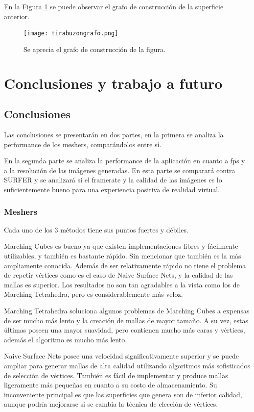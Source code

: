 \documentclass[12pt]{article}
\begin{document}
En la Figura \ref{grafobz} se puede observar el grafo de construcción de la superficie anterior. 
\begin{figure}[h!]
\texttt{[image: tirabuzongrafo.png]}
\caption{Se aprecia el grafo de construcción de la figura.}
\label{grafobz}
\end{figure}
\clearpage
\section{Conclusiones y trabajo a futuro}
\subsection{Conclusiones}
Las conclusiones se presentarán en dos partes, en la primera se analiza la performance de los meshers, comparándolos entre sí. 

En la segunda parte se analiza la performance de la aplicación en cuanto a fps y a la resolución de las imágenes generadas. En esta parte se comparará contra SURFER y se analizará si el framerate y la calidad de las imágenes es lo suficientemente bueno para una experiencia positiva de realidad virtual.
\subsubsection{Meshers}
Cada uno de los 3 métodos tiene sus puntos fuertes y débiles. 

Marching Cubes es bueno ya que existen implementaciones libres y fácilmente utilizables, y también es bastante rápido. Sin mencionar que también es la más ampliamente conocida. Además de ser relativamente rápido no tiene el problema de repetir vértices como es el caso de Naive Surface Nets, y la calidad de las mallas es superior. Los resultados no son tan agradables a la vista como los de Marching Tetrahedra, pero es considerablemente más veloz. 

Marching Tetrahedra soluciona algunos problemas de Marching Cubes a expensas de ser mucho más lento y la creación de mallas de mayor tamaño. A su vez, estas últimas poseen una mayor suavidad, pero contienen mucho más caras y vértices, además  el algoritmo es mucho más lento.

Naive Surface Nets posee una velocidad significativamente superior y se puede ampliar para generar mallas de alta calidad utilizando algoritmos más sofisticados de selección de vértices. También es fácil de implementar y produce mallas ligeramente más pequeñas en cuanto a su costo de almacenamiento. Su inconveniente principal es que las superficies que genera son de inferior calidad, aunque podría mejorarse si se cambia la técnica de elección de vértices. 
\end{document}
